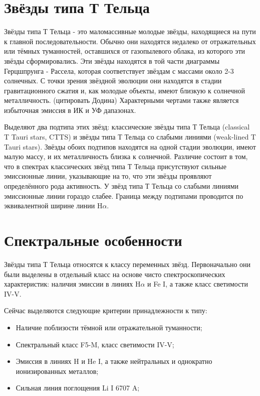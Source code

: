 
\section{Звёзды типа Т Тельца}
Звёзды типа Т Тельца - это маломассивные молодые звёзды, находящиеся на пути к главной последовательности. Обычно они находятся недалеко от отражательных или тёмных туманностей, оставшихся от газопылевого облака, из которого эти звёзды сформировались. Эти звёзды находятся в той части диаграммы Герцшпрунга - Рассела, которая соответствует звёздам с массами около 2-3 солнечных. С точки зрения звёздной эволюции они находятся в стадии гравитационного сжатия и, как молодые объекты, имеют близкую к солнечной металличность. (цитировать Додина) Характерными чертами также является избыточная эмиссия в ИК и УФ дапазонах.

Выделяют два подтипа этих звёзд: классические звёзды типа Т Тельца (classical T Tauri stars, CTTS) и звёзды типа Т Тельца со слабыми линиями (weak-lined T Tauri stars). Звёзды обоих подтипов находятся на одной стадии эволюции, имеют малую массу, и их металличность близка к солнечной. Различие состоит в том, что в спектрах классических звёзд типа Т Тельца присутствуют сильные эмиссионные линии, указывающие на то, что эти звёзды проявляют определённого рода активность. У звёзд типа Т Тельца со слабыми линиями эмиссионные линии гораздо слабее. Граница между подтипами проводится по эквивалентной ширине линии H$\alpha$. 

\section{Спектральные особенности}
Звёзды типа Т Тельца относятся к классу переменных звёзд. Первоначально они были выделены в отдельный класс на основе чисто спектроскопических характеристик: наличия эмиссии в линиях H$\alpha$ и Fe I, а также класс светимости IV-V. 

Сейчас выделяются следующие критерии принадлежности к типу:
\begin{itemize}
	\item Наличие поблизости тёмной или отражательной туманности;
	\item	Спектральный класс F5-M, класс светимости IV-V;
	\item	Эмиссия в линиях H и He I, а также нейтральных и однократно ионизированных металлов;
	\item	Сильная линия поглощения Li I 6707 A;
\end{itemize}


